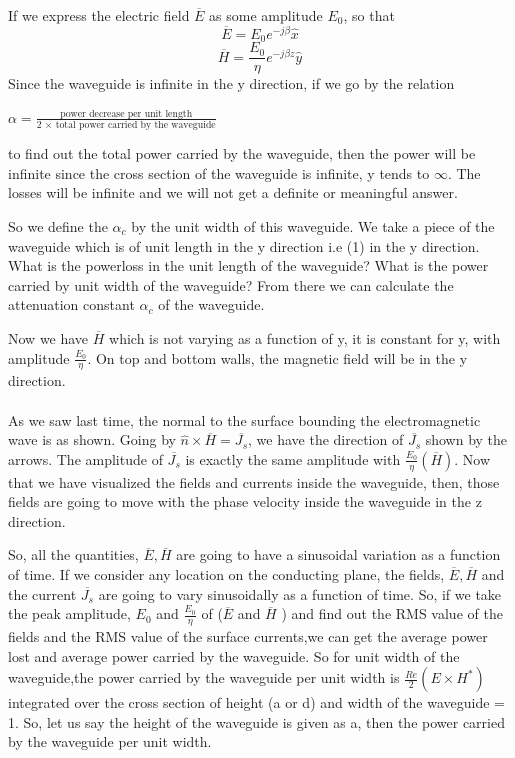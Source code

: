 If we express the electric field $\overline{E}$ as some amplitude $E_0$, so that
\begin{equation}
\overline{E} = E_0 e^{-j\beta }\hat{x}
\end{equation}
\begin{equation}
\overline{H} = \frac{E_0}{\eta} e^{-j\beta z}\hat{y}
\end{equation}
Since the waveguide is infinite in the y direction, if we go by the relation
\begin{center}
$\alpha = \frac{\text{power decrease per unit length}}{\text{2 $\times$ total power carried by the waveguide}}$	
\end{center}

to find out the total power carried by the waveguide, then the power will be infinite since the cross section of the waveguide is infinite, y tends to $\infty$. The losses will be infinite and we will not get a definite or meaningful answer.

So we define the $\alpha_{c}$ by the unit width of this waveguide. We take a piece of the waveguide which is of unit length in the y direction i.e (1) in the y direction. What is the powerloss in the unit length of the waveguide? What is the power carried by unit width of the waveguide? From there we can calculate the attenuation constant $\alpha_{c}$ of the waveguide. 

Now we have $\overline{H}$ which is not varying as a function of y, it is constant for y, with amplitude $\frac{E_0}{\eta}$. On top and bottom walls, the magnetic field will be in the y direction.\\\\ As we saw last time, the normal to the surface bounding the electromagnetic wave is as shown. Going by $\hat{n}\times\overline{H}=\overline{J_s}$, we have the direction of $\overline{J_s}$ shown by the arrows. The amplitude of $\overline{J_s}$ is exactly the same amplitude with $\frac{E_0}{\eta}(\overline{H})$. Now that we have visualized the fields and currents inside the waveguide, then, those fields are going to move with the phase velocity inside the waveguide in the z direction.

So, all the  quantities, $\overline{E}, \overline{H}$ are going to have a sinusoidal variation as a function of time. If we consider any location on the conducting plane, the fields, $\overline{E}, \overline{H}$ and the current $\overline{J_s}$ are going to vary sinusoidally as a function of time. So, if we take the peak amplitude, $E_0$ and $\frac{E_0}{\eta}$ of ($\overline{E}$ and $\overline{H}$ ) and find out the RMS value of the fields and the RMS value of the surface currents,we can get the average power lost and average power carried by the waveguide. So for unit width of the waveguide,the power carried by the waveguide per unit width is $\frac{Re}{2}(E \times H^*)$ integrated over the cross section of height (a or d) and width of the waveguide = 1. So, let us say the height of the waveguide is given as a, then the power carried by the waveguide per unit width.

